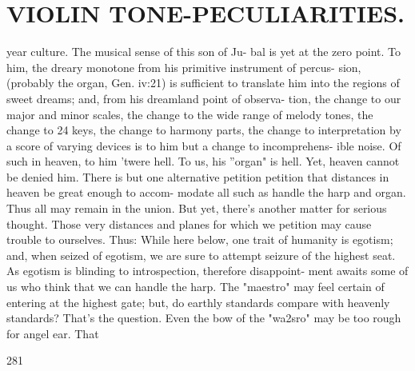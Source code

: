\documentclass{article}
\begin{document}
\section*{VIOLIN TONE-PECULIARITIES.}
year culture. The musical sense of this son of Ju- bal is yet at the zero point. To him, the dreary monotone from his primitive instrument of percus- sion, (probably the organ, Gen. iv:21) is sufficient to translate him into the regions of sweet dreams; and, from his dreamland point of observa- tion, the change to our major and minor scales, the change to the wide range of melody tones, the change to 24 keys, the change to harmony parts, the change to interpretation by a score of varying devices is to him but a change to incomprehens- ible noise. Of such in heaven, to him 'twere hell. To us, his ''organ" is hell. Yet, heaven cannot be denied him. There is but one alternative petition petition that distances in heaven be great enough to accom- modate all such as handle the harp and organ. Thus all may remain in the union. But yet, there's another matter for serious thought. Those very distances and planes for which we petition may cause trouble to ourselves. Thus: While here below, one trait of humanity is egotism; and, when seized of egotism, we are sure to attempt seizure of the highest seat. As egotism is blinding to introspection, therefore disappoint- ment awaits some of us who think that we can handle the harp. The "maestro" may feel certain of entering at the highest gate; but, do earthly standards compare with heavenly standards? That's the question. Even the bow of the "wa2sro" may be too rough for angel ear. That

281
\end{document}
